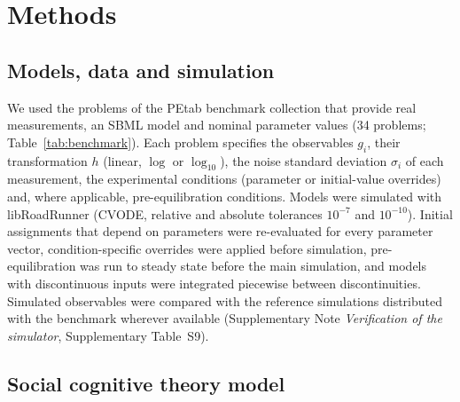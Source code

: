 \documentclass[pdflatex,sn-nature]{sn-jnl}
\theoremstyle{plain}
\begin{document}
\section*{Methods}\label{sec:methods}

\subsection*{Models, data and simulation}

We used the problems of the PEtab benchmark collection\cite{bib31,bib27} that provide real measurements, an SBML model and nominal parameter values (34 problems; Table~\ref{tab:benchmark}). Each problem specifies the observables $g_i$, their transformation $h$ (linear, $\log$ or $\log_{10}$), the noise standard deviation $\sigma_i$ of each measurement, the experimental conditions (parameter or initial-value overrides) and, where applicable, pre-equilibration conditions. Models were simulated with libRoadRunner\cite{bib32} (CVODE, relative and absolute tolerances $10^{-7}$ and $10^{-10}$). Initial assignments that depend on parameters were re-evaluated for every parameter vector, condition-specific overrides were applied before simulation, pre-equilibration was run to steady state before the main simulation, and models with discontinuous inputs were integrated piecewise between discontinuities. Simulated observables were compared with the reference simulations distributed with the benchmark wherever available (Supplementary Note \textit{Verification of the simulator}, Supplementary Table~S9).

\subsection*{Social cognitive theory model}
\end{document}

